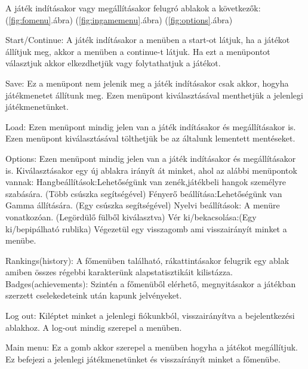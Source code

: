 A játék indításakor vagy megállításakor felugró ablakok a következők:
\newline
(\ref{fig:fomenu}.ábra)
(\ref{fig:ingamemenu}.ábra)
(\ref{fig:options}.ábra)
\par
Start/Continue:
A játék indításakor a menüben a start-ot látjuk, ha a játékot állítjuk meg, akkor a menüben a continue-t látjuk.
Ha ezt a  menüpontot választjuk akkor elkezdhetjük vagy folytathatjuk a játékot.
\par
Save:
Ez a menüpont nem jelenik meg a játék indításakor csak akkor, hogyha játékmenetet állítunk meg.
Ezen menüpont kiválasztásával menthetjük a jelenlegi játékmenetünket.
\par
Load:
Ezen menüpont mindig jelen van a játék indításakor és megállításakor is.
Ezen menüpont kiválasztásával tölthetjük be az általunk lementett mentéseket.
\par
Options:
\newline
Ezen menüpont mindig jelen van a játék indításakor és megállításakor is.
\newline
Kiválasztásakor egy új ablakra irányít át minket, ahol az alábbi menüpontok vannak:
\newline
Hangbeállítások:Lehetőségünk van zenék,játékbeli hangok személyre szabására. (Több csúszka segítségével)
\newline
Fényerő beállítása:Lehetőségünk van Gamma állítására. (Egy csúszka segítségével)
\newline
Nyelvi beállítások: A menüre vonatkozóan. (Legördülő fülből kiválasztva)
\newline
Vér ki/bekacsolása:(Egy ki/bepipálható rublika)
\newline
Végezetül egy visszagomb ami visszairányít minket a menübe.
\par
Rankings(history):
A főmenüben található, rákattintásakor felugrik egy ablak amiben összes régebbi karakterünk alapstatisztikáit kilistázza.
Badges(achievements):
Szintén a főmenüből elérhető, megnyitásakor a játékban szerzett cselekedeteink után kapunk jelvényeket.
\par
Log out:
Kiléptet minket a jelenlegi fiókunkból, visszairányítva a bejelentkezési ablakhoz.
A log-out mindig szerepel a menüben.
\par
Main menu:
Ez a gomb akkor szerepel a menüben hogyha a játékot megállítjuk.
Ez befejezi a jelenlegi játékmenetünket és visszaírányít minket a főmenübe.
\newpage
{}



